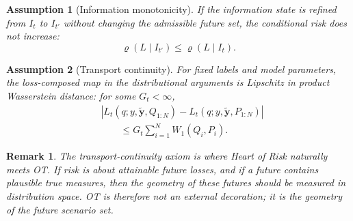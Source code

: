 \documentclass[10pt,journal]{IEEEtran}
\newtheorem{assumption}{Assumption}
\newtheorem{remark}{Remark}
\newcommand{\abs}[1]{\left\lvert #1 \right\rvert}
\newcommand{\risk}{\varrho}
\begin{document}
\begin{assumption}[Information monotonicity]
\label{ass:info-monotone}
If the information state is refined from $I_t$ to $I_{t'}$ without changing the admissible future set, the conditional risk does not increase:
\begin{equation}
    \risk(L\mid I_{t'})\le \risk(L\mid I_t).
\end{equation}
\end{assumption}

\begin{assumption}[Transport continuity]
\label{ass:transport-continuity}
For fixed labels and model parameters, the loss-composed map in the distributional arguments is Lipschitz in product Wasserstein distance: for some $G_t<\infty$,
\begin{equation}
\label{eq:transport-continuity}
\begin{aligned}
&\abs{L_t(q;y,\tilde{\mathbf y},Q_{1:N})
      -L_t(q;y,\tilde{\mathbf y},P_{1:N})} \\
&\hspace{2em}\le G_t\sum_{i=1}^{N} W_1(Q_i,P_i).
\end{aligned}
\end{equation}
\end{assumption}

\begin{remark}
The transport-continuity axiom is where Heart of Risk naturally meets OT. If risk is about attainable future losses, and if a future contains plausible true measures, then the geometry of these futures should be measured in distribution space. OT is therefore not an external decoration; it is the geometry of the future scenario set.
\end{remark}
\end{document}
